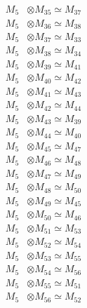 \begin{align*}
M_{5} &\otimes M_{35} \simeq M_{37} \\
M_{5} &\otimes M_{36} \simeq M_{38} \\
M_{5} &\otimes M_{37} \simeq M_{33} \\
M_{5} &\otimes M_{38} \simeq M_{34} \\
M_{5} &\otimes M_{39} \simeq M_{41} \\
M_{5} &\otimes M_{40} \simeq M_{42} \\
M_{5} &\otimes M_{41} \simeq M_{43} \\
M_{5} &\otimes M_{42} \simeq M_{44} \\
M_{5} &\otimes M_{43} \simeq M_{39} \\
M_{5} &\otimes M_{44} \simeq M_{40} \\
M_{5} &\otimes M_{45} \simeq M_{47} \\
M_{5} &\otimes M_{46} \simeq M_{48} \\
M_{5} &\otimes M_{47} \simeq M_{49} \\
M_{5} &\otimes M_{48} \simeq M_{50} \\
M_{5} &\otimes M_{49} \simeq M_{45} \\
M_{5} &\otimes M_{50} \simeq M_{46} \\
M_{5} &\otimes M_{51} \simeq M_{53} \\
M_{5} &\otimes M_{52} \simeq M_{54} \\
M_{5} &\otimes M_{53} \simeq M_{55} \\
M_{5} &\otimes M_{54} \simeq M_{56} \\
M_{5} &\otimes M_{55} \simeq M_{51} \\
M_{5} &\otimes M_{56} \simeq M_{52} \\
\end{align*}

